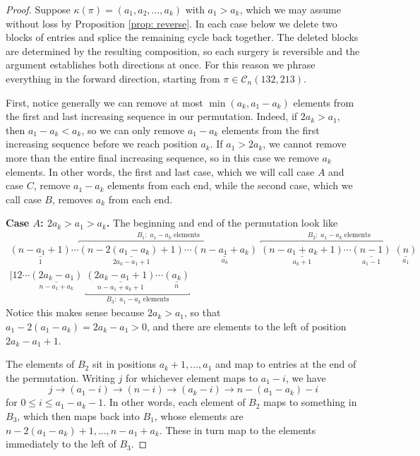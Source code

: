 \documentclass[11pt]{article}
\newcommand\C{\mathcal C}
\theoremstyle{definition}
\begin{document}
\begin{proof}
    Suppose $\kappa(\pi) = (a_1,a_2,\dots,a_k)$ with $a_1 > a_k$, which we may assume without loss by Proposition \ref{prop: reverse}. In each case below we delete two blocks of entries and splice the remaining cycle back together. The deleted blocks are determined by the resulting composition, so each surgery is reversible and the argument establishes both directions at once. For this reason we phrase everything in the forward direction, starting from $\pi \in \C_n(132,213)$.

    First, notice generally we can remove at most $\min(a_k,a_1-a_k)$ elements from the first and last increasing sequence in our permutation. Indeed, if $2a_k > a_1$, then $a_1 - a_k < a_k$, so we can only remove $a_1-a_k$ elements from the first increasing sequence before we reach position $a_k$. If $a_1 > 2a_k$, we cannot remove more than the entire final increasing sequence, so in this case we remove $a_k$ elements. In other words, the first and last case, which we will call case $A$ and case $C$, remove $a_1 - a_k$ elements from each end, while the second case, which we call case $B$, removes $a_k$ from each end.

    \medskip
    \noindent\textbf{Case $A$: $2a_k > a_1 > a_k$.} The beginning and end of the permutation look like
    \[
    \begin{gathered}
    \underset{1}{\underline{(n-a_1+1)}} \cdots \overbracket{\underset{2a_k - a_1 + 1}{\underline{(n-2(a_1-a_k) + 1)}}\cdots\underset{a_k}{\underline{(n-a_1+a_k)}}}^{B_1: \; a_1-a_k \; \text{elements}}\; \overbracket{\underset{a_k+1}{\underline{(n-a_1+a_k+1)}}\cdots \underset{a_1-1}{\underline{(n-1)}} \;\underset{a_1}{\underline{(n)}}}^{B_2: \; a_1-a_k \; \text{elements}} \\  |12 \cdots \underset{n-a_1+a_k}{\underline{(2a_k-a_1)}} \; \underbracket{\underset{n-a_1+a_k+1}{\underline{(2a_k-a_1+1)}}\cdots \underset{n}{\underline{(a_k)}}}_{B_3: \; a_1-a_k \; \text{elements}}
    \end{gathered}
    \]
    Notice this makes sense because $2a_k > a_1$, so that $a_1 - 2(a_1-a_k) = 2a_k - a_1 > 0$, and there are elements to the left of position $2a_k - a_1 + 1$.

    The elements of $B_2$ sit in positions $a_k+1,\dots,a_1$ and map to entries at the end of the permutation. Writing $j$ for whichever element maps to $a_1 - i$, we have
    \[
    j \to (a_1 - i) \to (n-i) \to (a_k-i) \to n- (a_1-a_k) -i
    \]
    for $0 \leq i \leq a_1 - a_k - 1$. In other words, each element of $B_2$ maps to something in $B_3$, which then maps back into $B_1$, whose elements are $n-2(a_1-a_k) + 1,\dots,n-a_1+a_k$. These in turn map to the elements immediately to the left of $B_3$.


\end{proof}
\end{document}
